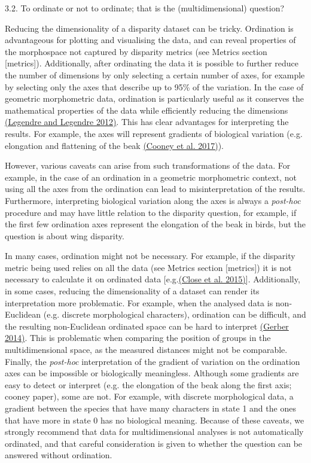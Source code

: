 3.2. To ordinate or not to ordinate; that is the (multidimensional)
question?

Reducing the dimensionality of a disparity dataset can be tricky.
Ordination is advantageous for plotting and visualising the data, and
can reveal properties of the morphospace not captured by disparity
metrics (see Metrics section {[}metrics{]}). Additionally, after
ordinating the data it is possible to further reduce the number of
dimensions by only selecting a certain number of axes, for example by
selecting only the axes that describe up to 95\% of the variation. In
the case of geometric morphometric data, ordination is particularly
useful as it conserves the mathematical properties of the data while
efficiently reducing the dimensions
\href{https://paperpile.com/c/sTGYvp/oFiP}{(Legendre and Legendre
2012)}. This has clear advantages for interpreting the results. For
example, the axes will represent gradients of biological variation (e.g.
elongation and flattening of the beak
\href{https://paperpile.com/c/sTGYvp/RjqE}{(Cooney et al. 2017)}).

However, various caveats can arise from such transformations of the
data. For example, in the case of an ordination in a geometric
morphometric context, not using all the axes from the ordination can
lead to misinterpretation of the results. Furthermore, interpreting
biological variation along the axes is always a \emph{post-hoc}
procedure and may have little relation to the disparity question, for
example, if the first few ordination axes represent the elongation of
the beak in birds, but the question is about wing disparity.

In many cases, ordination might not be necessary. For example, if the
disparity metric being used relies on all the data (see Metrics section
{[}metrics{]}) it is not necessary to calculate it on ordinated data
{[}e.g.\href{https://paperpile.com/c/sTGYvp/PbSx}{(Close et al.
2015)}{]}. Additionally, in some cases, reducing the dimensionality of a
dataset can render its interpretation more problematic. For example,
when the analysed data is non-Euclidean (e.g. discrete morphological
characters), ordination can be difficult, and the resulting
non-Euclidean ordinated space can be hard to interpret
\href{https://paperpile.com/c/sTGYvp/SJbC}{(Gerber 2014)}. This is
problematic when comparing the position of groups in the
multidimensional space, as the measured distances might not be
comparable. Finally, the \emph{post-hoc} interpretation of the gradient
of variation on the ordination axes can be impossible or biologically
meaningless. Although some gradients are easy to detect or interpret
(e.g. the elongation of the beak along the first axis; cooney paper),
some are not. For example, with discrete morphological data, a gradient
between the species that have many characters in state 1 and the ones
that have more in state 0 has no biological meaning. Because of these
caveats, we strongly recommend that data for multidimensional analyses
is not automatically ordinated, and that careful consideration is given
to whether the question can be answered without ordination.

